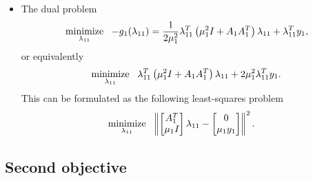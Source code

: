\documentclass[12pt]{article}
\begin{document}
\begin{itemize}
\item The dual problem
%
\begin{align*}
  \mathop{\mbox{minimize}}_{\lambda_{11}} \ \  -g_1(\lambda_{11}) = \frac{1}{2\mu_1^2}\lambda_{11}^T\left(\mu_1^2 I+A_1A_1^T\right)\lambda_{11} + \lambda_{11}^Ty_1,
\end{align*}
%
or equivalently
%
\begin{align*}
  \mathop{\mbox{minimize}}_{\lambda_{11}} \ \  \lambda_{11}^T\left(\mu_1^2 I+A_1A_1^T\right)\lambda_{11} + 2\mu_1^2\lambda_{11}^Ty_1.
\end{align*}
%
This can be formulated as the following least-squares problem
%
\begin{align*}
\mathop{\mbox{minimize}}_{\lambda_{11}} \ \  & \left\lVert\begin{bmatrix}A_1^T \\ \mu_1I \end{bmatrix}\lambda_{11} - \begin{bmatrix} 0 \\ \mu_1y_1 \end{bmatrix}\right\rVert^2.
\end{align*}

\end{itemize}

\newpage

\subsection{Second objective}
\end{document}
